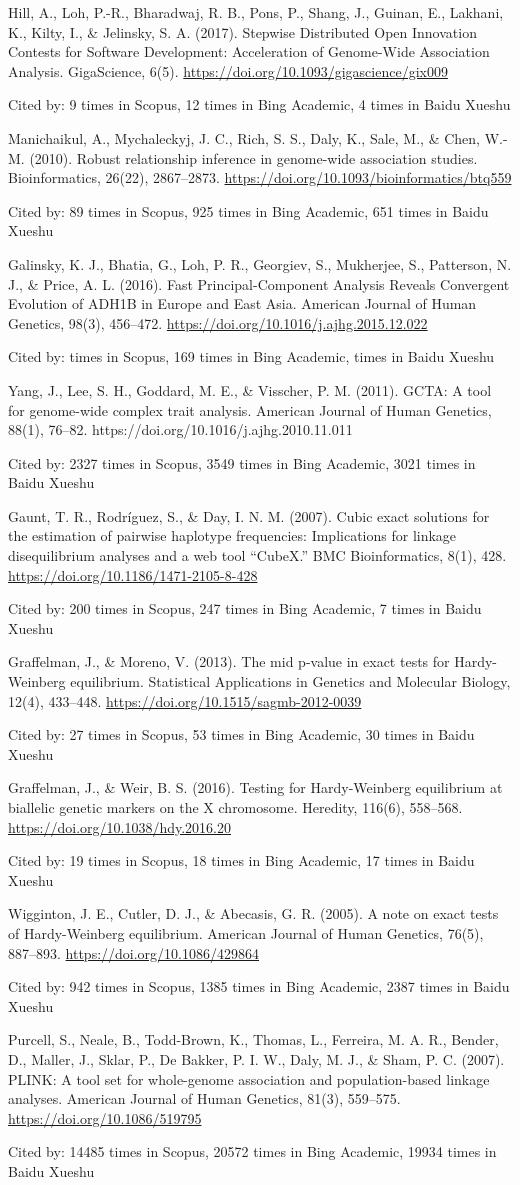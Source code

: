 \documentclass[]{article}
\newcommand{\cb}[3]{\par Cited by: {\color{blue}\Huge #1} times in Scopus, {\color{blue}\Huge #2} times in Bing Academic, {\color{blue}\Huge #3} times in Baidu Xueshu}
\begin{document}
Hill, A., Loh, P.-R., Bharadwaj, R. B., Pons, P., Shang, J., Guinan, E., Lakhani, K., Kilty, I., \& Jelinsky, S. A. (2017). Stepwise Distributed Open Innovation Contests for Software Development: Acceleration of Genome-Wide Association Analysis. GigaScience, 6(5). \url{https://doi.org/10.1093/gigascience/gix009}\cb{9}{12}{4}

Manichaikul, A., Mychaleckyj, J. C., Rich, S. S., Daly, K., Sale, M., \& Chen, W.-M. (2010). Robust relationship inference in genome-wide association studies. Bioinformatics, 26(22), 2867–2873. \url{https://doi.org/10.1093/bioinformatics/btq559}\cb{89}{925}{651}

Galinsky, K. J., Bhatia, G., Loh, P. R., Georgiev, S., Mukherjee, S., Patterson, N. J., \& Price, A. L. (2016). Fast Principal-Component Analysis Reveals Convergent Evolution of ADH1B in Europe and East Asia. American Journal of Human Genetics, 98(3), 456–472. \url{https://doi.org/10.1016/j.ajhg.2015.12.022}\cb{}{169}{}

Yang, J., Lee, S. H., Goddard, M. E., \& Visscher, P. M. (2011). GCTA: A tool for genome-wide complex trait analysis. American Journal of Human Genetics, 88(1), 76–82. {https://doi.org/10.1016/j.ajhg.2010.11.011}\cb{2327}{3549}{3021}

Gaunt, T. R., Rodríguez, S., \& Day, I. N. M. (2007). Cubic exact solutions for the estimation of pairwise haplotype frequencies: Implications for linkage disequilibrium analyses and a web tool ``CubeX.'' BMC Bioinformatics, 8(1), 428. \url{https://doi.org/10.1186/1471-2105-8-428}\cb{200}{247}{7}

Graffelman, J., \& Moreno, V. (2013). The mid p-value in exact tests for Hardy-Weinberg equilibrium. Statistical Applications in Genetics and Molecular Biology, 12(4), 433–448. \url{https://doi.org/10.1515/sagmb-2012-0039}\cb{27}{53}{30}

Graffelman, J., \& Weir, B. S. (2016). Testing for Hardy-Weinberg equilibrium at biallelic genetic markers on the X chromosome. Heredity, 116(6), 558–568. \url{https://doi.org/10.1038/hdy.2016.20}\cb{19}{18}{17}

Wigginton, J. E., Cutler, D. J., \& Abecasis, G. R. (2005). A note on exact tests of Hardy-Weinberg equilibrium. American Journal of Human Genetics, 76(5), 887–893. \url{https://doi.org/10.1086/429864}\cb{942}{1385}{2387}

Purcell, S., Neale, B., Todd-Brown, K., Thomas, L., Ferreira, M. A. R., Bender, D., Maller, J., Sklar, P., De Bakker, P. I. W., Daly, M. J., \& Sham, P. C. (2007). PLINK: A tool set for whole-genome association and population-based linkage analyses. American Journal of Human Genetics, 81(3), 559–575. \url{https://doi.org/10.1086/519795}\cb{14485}{20572}{19934}
\end{document}
